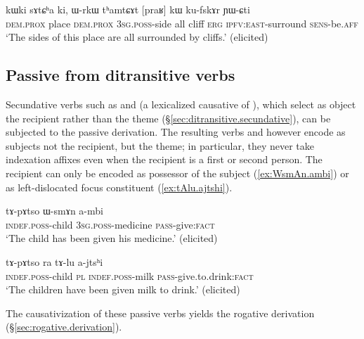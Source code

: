 \begin{exe}
\ex \label{ex:praR.kW.kufskAr}
 \gll kɯki sɤtɕʰa ki, ɯ-rkɯ tʰamtɕɤt [praʁ] kɯ ku-fskɤr ɲɯ-ɕti \\
 \textsc{dem}.\textsc{prox} place \textsc{dem}.\textsc{prox} \textsc{3sg}.\textsc{poss}-side all cliff \textsc{erg} \textsc{ipfv}:\textsc{east}-surround \textsc{sens}-be.\textsc{aff} \\
 \glt `The sides of this place are all surrounded by cliffs.' (elicited)
 \end{exe}
 
\subsection{Passive from ditransitive verbs} \label{passive.ditransitive}
Secundative verbs such as  and  (a lexicalized causative of ), which select as object the recipient rather than the theme (§\ref{sec:ditransitive.secundative}), can be subjected to the passive derivation. The resulting verbs   and    however encode as subjects not the recipient, but the theme; in particular, they never take indexation affixes even when the recipient is a first or second person. The recipient can only be encoded as possessor of the subject (\ref{ex:WsmAn.ambi}) or as left-dislocated focus constituent (\ref{ex:tAlu.ajtshi}).

\begin{exe}
\ex \label{ex:WsmAn.ambi}
 \gll tɤ-pɤtso ɯ-smɤn a-mbi  \\
  \textsc{indef}.\textsc{poss}-child \textsc{3sg}.\textsc{poss}-medicine \textsc{pass}-give:\textsc{fact} \\
  \glt `The child has been given his medicine.'  (elicited)
\end{exe} 

\begin{exe}
\ex \label{ex:tAlu.ajtshi}
 \gll tɤ-pɤtso ra tɤ-lu a-jtsʰi \\
\textsc{indef}.\textsc{poss}-child \textsc{pl} \textsc{indef}.\textsc{poss}-milk \textsc{pass}-give.to.drink:\textsc{fact} \\
\glt `The children have been given milk to drink.' (elicited)
\end{exe} 
 
 The causativization of these passive verbs yields the rogative derivation (§\ref{sec:rogative.derivation}).
 
